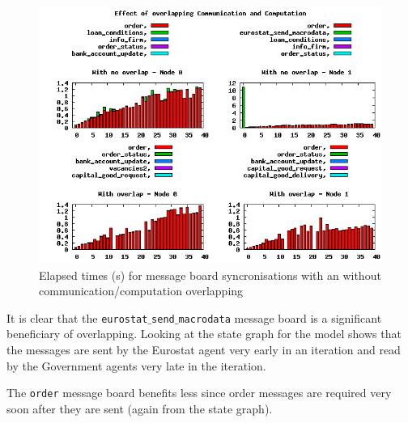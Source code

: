 \begin{figure}[ht]
 \centering
  \includegraphics[width=450pt]{overlap.png}
 \caption{Elapsed times (s) for message board syncronisations with an without communication/computation overlapping}
 \label{fig:overlap}
\end{figure}




It is clear that the \texttt{eurostat$\_$send$\_$macrodata} message board is a significant beneficiary of overlapping. Looking at the state graph for the model shows that the messages are sent by the Eurostat agent very early in an iteration and read by the Government agents very late in the iteration.

The \texttt{order} message board benefits less since order messages are required very soon after they are sent (again from the state graph).






 
